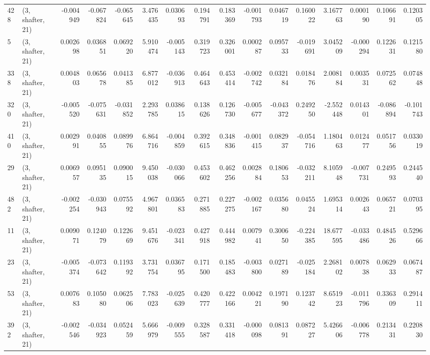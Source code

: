 \begin{tabular}{llrrrrrrrrrrrrrr}
428 &  (3, shafter, 21) &  -0.004949 & -0.067824 & -0.065645 &    3.476435 &  0.030693 &   0.194791 &  0.183369 & -0.001793 &  0.046719 &  0.160022 &     3.167763 &  0.000190 &  0.106691 &  0.120305 \\
5   &  (3, shafter, 21) &   0.002698 &  0.036851 &  0.069220 &    5.910474 & -0.005143 &   0.319723 &  0.326001 &  0.000287 &  0.095733 & -0.019691 &     3.045209 & -0.000294 &  0.122631 &  0.121580 \\
338 &  (3, shafter, 21) &   0.004803 &  0.065678 &  0.041385 &    6.877012 & -0.036913 &   0.464643 &  0.453414 & -0.002742 &  0.032184 &  0.018476 &     2.008184 &  0.003531 &  0.072562 &  0.074848 \\
320 &  (3, shafter, 21) &  -0.005520 & -0.075631 & -0.031852 &    2.293785 &  0.038615 &   0.138626 &  0.126730 & -0.005677 & -0.043372 &  0.249250 &    -2.552448 &  0.014301 & -0.086894 & -0.101743 \\
410 &  (3, shafter, 21) &   0.002991 &  0.040855 &  0.089976 &    6.864716 & -0.004859 &   0.392615 &  0.348836 & -0.001415 &  0.082937 & -0.054716 &     1.180463 &  0.012477 &  0.051756 &  0.033019 \\
29  &  (3, shafter, 21) &   0.006957 &  0.095135 &  0.090015 &    9.450038 & -0.030066 &   0.453602 &  0.462256 &  0.002884 &  0.180653 & -0.032211 &     8.105948 & -0.007731 &  0.249593 &  0.244540 \\
482 &  (3, shafter, 21) &  -0.002254 & -0.030943 &  0.075592 &    4.967801 &  0.036583 &   0.271885 &  0.227275 & -0.002167 &  0.035680 &  0.045524 &     1.695314 &  0.002643 &  0.065721 &  0.070395 \\
11  &  (3, shafter, 21) &   0.009071 &  0.124079 &  0.122669 &    9.451676 & -0.023341 &   0.427918 &  0.444982 &  0.007941 &  0.300650 & -0.224385 &    18.677595 & -0.033486 &  0.484526 &  0.529666 \\
23  &  (3, shafter, 21) &  -0.005374 & -0.073642 &  0.119392 &    3.731754 &  0.036795 &   0.171500 &  0.185483 & -0.003800 &  0.027189 & -0.025184 &     2.268102 &  0.007838 &  0.062933 &  0.067487 \\
53  &  (3, shafter, 21) &   0.007683 &  0.105080 &  0.062506 &    7.783023 & -0.025639 &   0.420777 &  0.422166 &  0.004221 &  0.197190 &  0.123742 &     8.651923 & -0.011796 &  0.336309 &  0.291411 \\
392 &  (3, shafter, 21) &  -0.002546 & -0.034923 &  0.052459 &    5.666979 & -0.009555 &   0.328587 &  0.331418 & -0.000098 &  0.081391 &  0.087227 &     5.426606 & -0.006778 &  0.213431 &  0.220830 \\

\end{tabular}
